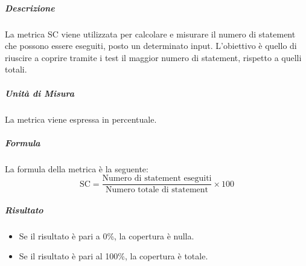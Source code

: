			\subparagraph{Descrizione}
			La metrica SC viene utilizzata per calcolare e misurare il numero di statement che possono essere eseguiti, posto un determinato input. L'obiettivo è quello di riuscire a coprire tramite i test il maggior numero di statement, rispetto a quelli totali.

			\subparagraph{Unità di Misura}
			La metrica viene espressa in percentuale.

			\subparagraph{Formula}
			La formula della metrica è la seguente:
			\[
				\text{SC} = \frac{\text{Numero di statement eseguiti}}{\text{Numero totale di statement}} \times 100
			\]

			\subparagraph{Risultato}
			\begin{itemize}
				\item Se il risultato è pari a 0\%, la copertura è nulla.
				\item Se il risultato è pari al 100\%, la copertura è totale.
			\end{itemize}
